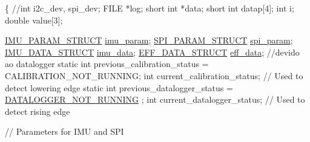 \begin{DoxyCode}
\{
  \textcolor{comment}{//int i2c\_dev, spi\_dev;}
  FILE *log;
  \textcolor{keywordtype}{short} \textcolor{keywordtype}{int} *data;
  \textcolor{keywordtype}{short} \textcolor{keywordtype}{int} datap[4];
  \textcolor{keywordtype}{int} i;
  \textcolor{keywordtype}{double} value[3];
  
  \hyperlink{structIMU__PARAM__STRUCT}{IMU\_PARAM\_STRUCT} \hyperlink{main2_01_07C_xC3_xB3pia_01em_01conflito_01de_01Caio_01Gustavo_01Mesquita_01Angelo_012013-04-28_08_8c_a9c6b2109fb9402446f92995db60951b5}{imu\_param};
  \hyperlink{structSPI__PARAM__STRUCT}{SPI\_PARAM\_STRUCT} \hyperlink{main2_01_07C_xC3_xB3pia_01em_01conflito_01de_01Caio_01Gustavo_01Mesquita_01Angelo_012013-04-28_08_8c_adec2468b88cf50b20e5cf399a3b7e994}{spi\_param};
  \hyperlink{structIMU__DATA__STRUCT}{IMU\_DATA\_STRUCT} \hyperlink{main2_01_07C_xC3_xB3pia_01em_01conflito_01de_01Caio_01Gustavo_01Mesquita_01Angelo_012013-04-28_08_8c_a3cfea12cbe9ca7f1681c950e4cd68606}{imu\_data};
  \hyperlink{structEFF__DATA__STRUCT}{EFF\_DATA\_STRUCT} \hyperlink{main2_01_07C_xC3_xB3pia_01em_01conflito_01de_01Caio_01Gustavo_01Mesquita_01Angelo_012013-04-28_08_8c_a5650ece8c3a277c7f158d75ae65265fa}{eff\_data};
  \textcolor{comment}{//devido ao datalogger}
    \textcolor{keyword}{static} \textcolor{keywordtype}{int} previous\_calibration\_status = CALIBRATION\_NOT\_RUNNING;
    \textcolor{keywordtype}{int} current\_calibration\_status; \textcolor{comment}{// Used to detect lowering edge}
    \textcolor{keyword}{static} \textcolor{keywordtype}{int} previous\_datalogger\_status = \hyperlink{datalogger_01_07Caio-PC's_01conflicted_01copy_012012-11-23_08_8h_a1a224da36800f52f56f30619849f7f5d}{DATALOGGER\_NOT\_RUNNING}
      ;
    \textcolor{keywordtype}{int} current\_datalogger\_status; \textcolor{comment}{// Used to detect rising edge}
  
\textcolor{comment}{// Parameters for IMU and SPI}


\end{DoxyCode}
